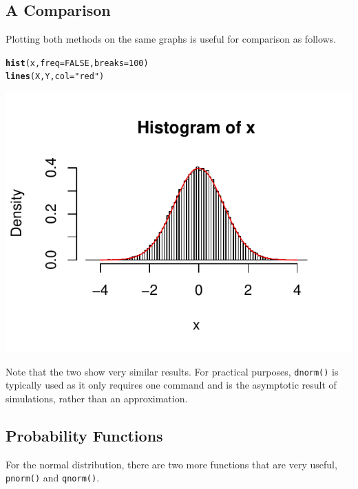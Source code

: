 \documentclass{report}\usepackage[]{graphicx}\usepackage[]{color}
\makeatletter
\def\maxwidth{ %
  \ifdim\Gin@nat@width>\linewidth
    \linewidth
  \else
    \Gin@nat@width
  \fi
}
\newcommand{\hlnum}[1]{\textcolor[rgb]{0.686,0.059,0.569}{#1}}%
\newcommand{\hlstr}[1]{\textcolor[rgb]{0.192,0.494,0.8}{#1}}%
\newcommand{\hlstd}[1]{\textcolor[rgb]{0.345,0.345,0.345}{#1}}%
\newcommand{\hlkwc}[1]{\textcolor[rgb]{0.333,0.667,0.333}{#1}}%
\newcommand{\hlkwd}[1]{\textcolor[rgb]{0.737,0.353,0.396}{\textbf{#1}}}%
\newenvironment{kframe}{%
 \def\at@end@of@kframe{}%
 \ifinner\ifhmode%
  \def\at@end@of@kframe{\end{minipage}}%
  \begin{minipage}{\columnwidth}%
 \fi\fi%
 \def\FrameCommand##1{\hskip\@totalleftmargin \hskip-\fboxsep
 \colorbox{shadecolor}{##1}\hskip-\fboxsep
     \hskip-\linewidth \hskip-\@totalleftmargin \hskip\columnwidth}%
 \MakeFramed {\advance\hsize-\width
   \@totalleftmargin\z@ \linewidth\hsize
   \@setminipage}}%
 {\par\unskip\endMakeFramed%
 \at@end@of@kframe}
\newenvironment{knitrout}{}{} %
\makeatother
\begin{document}
\subsection{A Comparison} 
Plotting both methods on the same graphs is useful for comparison as follows.  
\begin{knitrout}
\color{fgcolor}\begin{kframe}
\begin{alltt}
\hlkwd{hist}\hlstd{(x,} \hlkwc{freq} \hlstd{=} \hlnum{FALSE}\hlstd{,} \hlkwc{breaks} \hlstd{=} \hlnum{100}\hlstd{)}
\hlkwd{lines}\hlstd{(X,Y,} \hlkwc{col} \hlstd{=} \hlstr{"red"}\hlstd{)}
\end{alltt}
\end{kframe}

{\centering \includegraphics[width=\maxwidth]{figure/unnamed-chunk-53-1} 

}



\end{knitrout}

Note that the two show very similar results.  For practical purposes, \texttt{dnorm()} is typically used as it only requires one command and is the asymptotic result of simulations, rather than an approximation.  

\subsection{Probability Functions}
For the normal distribution, there are two more functions that are very useful, \texttt{pnorm()} and \texttt{qnorm()}. 
\end{document}
